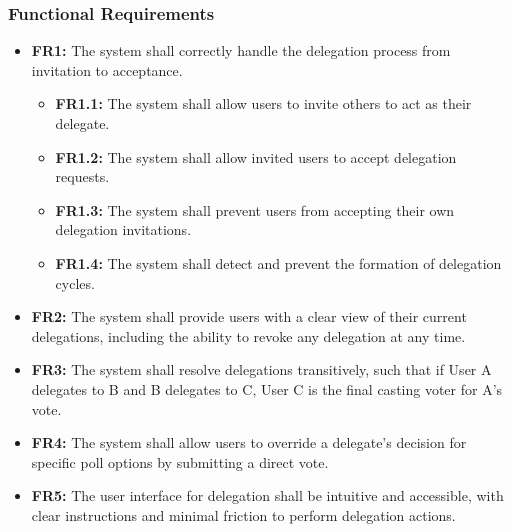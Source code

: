 \subsubsection{Functional Requirements}
\begin{itemize}
    \item \textbf{FR1:} The system shall correctly handle the delegation process from invitation to acceptance.
    \begin{itemize}
        \item \textbf{FR1.1:} The system shall allow users to invite others to act as their delegate.
        \item \textbf{FR1.2:} The system shall allow invited users to accept delegation requests.
        \item \textbf{FR1.3:} The system shall prevent users from accepting their own delegation invitations.
        \item \textbf{FR1.4:} The system shall detect and prevent the formation of delegation cycles.
    \end{itemize}

    \item \textbf{FR2:} The system shall provide users with a clear view of their current delegations, including the ability to revoke any delegation at any time.

    \item \textbf{FR3:} The system shall resolve delegations transitively, such that if User A delegates to B and B delegates to C, User C is the final casting voter for A's vote.

    \item \textbf{FR4:} The system shall allow users to override a delegate's decision for specific poll options by submitting a direct vote.
    
    \item \textbf{FR5:} The user interface for delegation shall be intuitive and accessible, with clear instructions and minimal friction to perform delegation actions.
\end{itemize}

